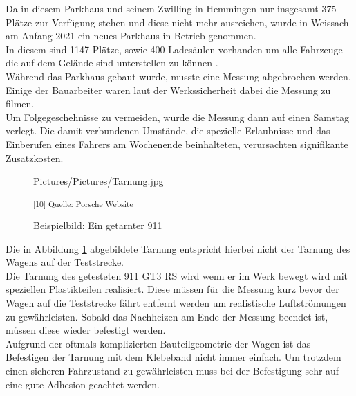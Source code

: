 Da in diesem Parkhaus und seinem Zwilling in Hemmingen nur insgesamt 375 Plätze zur Verfügung stehen und diese nicht mehr ausreichen, wurde in Weissach am Anfang 2021 ein neues Parkhaus in Betrieb genommen. \\
In diesem sind 1147 Plätze, sowie 400 Ladesäulen vorhanden um alle Fahrzeuge die auf dem Gelände sind unterstellen zu können \cite{PTPark}. \\

Während das Parkhaus gebaut wurde, musste eine Messung abgebrochen werden. Einige der Bauarbeiter waren laut der Werkssicherheit dabei die Messung zu filmen. \\
Um Folgegeschehnisse zu vermeiden, wurde die Messung dann auf einen Samstag verlegt. Die damit verbundenen Umstände, die spezielle Erlaubnisse und das Einberufen eines Fahrers am Wochenende beinhalteten, verursachten signifikante Zusatzkosten. \\

\begin{figure}[H]
	\begin{center}
		\begin{overpic}[width=\linewidth]{Pictures/Pictures/Tarnung.jpg}
			
		\end{overpic}
		
		
		\caption{Beispielbild: Ein getarnter 911}
		\label{Tarnung}
		\small\textsuperscript{[10] Quelle: \href{https://presse.porsche.de/prod/presse_pag/PressResources.nsf/Content?ReadForm&languageversionid=832808&hl=christophorus-385-dynamic-bastion-of-stability}{Porsche Website}}
		\label{Tarnung}
	\end{center}
\end{figure} 

Die in Abbildung \ref{Tarnung} abgebildete Tarnung entspricht hierbei nicht der Tarnung des Wagens auf der Teststrecke. \\
Die Tarnung des getesteten 911 GT3 RS wird wenn er im Werk bewegt wird mit speziellen Plastikteilen realisiert. Diese müssen für die Messung kurz bevor der Wagen auf die Teststrecke fährt entfernt werden um realistische Luftströmungen zu gewährleisten. Sobald das Nachheizen am Ende der Messung beendet ist, müssen diese wieder befestigt werden.\\

Aufgrund der oftmals komplizierten Bauteilgeometrie der Wagen ist das Befestigen der Tarnung mit dem Klebeband nicht immer einfach. Um trotzdem einen sicheren Fahrzustand zu gewährleisten muss bei der Befestigung sehr auf eine gute Adhesion geachtet werden.\\

